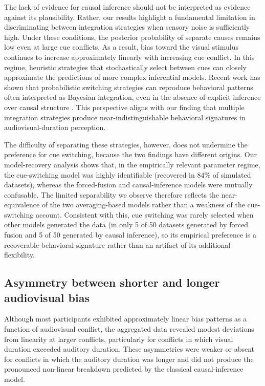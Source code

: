 \documentclass{jov}
\providecommand{\citep}[1]{\cite{#1}}
\begin{document}
The lack of evidence for causal inference should not be interpreted as evidence against its plausibility. Rather, our results highlight a fundamental limitation in discriminating between integration strategies when sensory noise is sufficiently high. Under these conditions, the posterior probability of separate causes remains low even at large cue conflicts. As a result, bias toward the visual stimulus continues to increase approximately linearly with increasing cue conflict. In this regime, heuristic strategies that stochastically select between cues can closely approximate the predictions of more complex inferential models. Recent work has shown that probabilistic switching strategies can reproduce behavioral patterns often interpreted as Bayesian integration, even in the absence of explicit inference over causal structure \citep{ni2024computational}. This perspective aligns with our finding that multiple integration strategies produce near-indistinguishable behavioral signatures in audiovisual-duration perception.

The difficulty of separating these strategies, however, does not undermine the preference for cue switching, because the two findings have different origins. Our model-recovery analysis shows that, in the empirically relevant parameter regime, the cue-switching model was highly identifiable (recovered in 84\% of simulated datasets), whereas the forced-fusion and causal-inference models were mutually confusable. The limited separability we observe therefore reflects the near-equivalence of the two averaging-based models rather than a weakness of the cue-switching account. Consistent with this, cue switching was rarely selected when other models generated the data (in only 5 of 50 datasets generated by forced fusion and 5 of 50 generated by causal inference), so its empirical preference is a recoverable behavioral signature rather than an artifact of its additional flexibility.

\subsection{Asymmetry between shorter and longer audiovisual bias}

Although most participants exhibited approximately linear bias patterns as a function of audiovisual conflict, the aggregated data revealed modest deviations from linearity at larger conflicts, particularly for conflicts in which visual duration exceeded auditory duration. These asymmetries were weaker or absent for conflicts in which the auditory duration was longer and did not produce the pronounced non-linear breakdown predicted by the classical causal-inference model.
\end{document}
